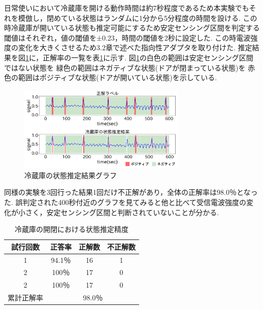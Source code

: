 \documentclass[Japanese]{dicomopapers}
\begin{document}
日常使いにおいて冷蔵庫を開ける動作時間は約7秒程度であるため本実験でもそれを模倣し，閉めている状態はランダムに1分から5分程度の時間を設ける.
この時冷蔵庫が開いている状態も推定可能にするため安定センシング区間を判定する閾値はそれぞれ，値の閾値を±0.23，時間の閾値を2秒に設定した.
この時電波強度の変化を大きくさせるため3.2章で述べた指向性アダプタを取り付けた.
推定結果を図\ref{refrigerator_graph}に，正解率の一覧を表\ref{refrigerator_fig}に示す.
図\ref{refrigerator_graph}の白色の範囲は安定センシング区間ではない状態を 緑色の範囲はネガティブな状態(ドアが閉まっている状態)を 赤色の範囲はポジティブな状態(ドアが開いている状態)を示している.
\begin{figure}[ht]
    \centering
    \includegraphics[width=8cm]{refrigerator_graph.png}
    \caption{冷蔵庫の状態推定結果グラフ}
    \label{refrigerator_graph}
\end{figure}

同様の実験を3回行った結果1回だけ不正解があり，全体の正解率は98.0％となった.
誤判定された400秒付近のグラフを見てみると他と比べて受信電波強度の変化が小さく，安定センシング区間と判断されていないことが分かる.


\begin{table}[htb]
    \begin{center}
        \caption{冷蔵庫の開閉における状態推定精度}
        \label{refrigerator_fig}
        \begin{tabular}{|c|c|c|c|} \hline
        試行回数 & 正答率 & 正解数 & 不正解数 \\ \hline
        1 & 94.1％ & 16 & 1 \\ \hline
        2 & 100％ & 17 & 0 \\ \hline
        2 & 100％ & 17 & 0 \\ \hline \hline
        累計正解率 & \multicolumn{3}{c|}{98.0％} \\ \hline
        \end{tabular}
    \end{center}
\end{table}
\end{document}
